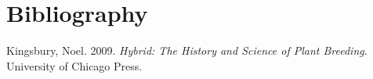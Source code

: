 \documentclass[ignorenonframetext,aspectratio=169]{beamer}
\begin{document}
\hypertarget{bibliography}{%
\section*{Bibliography}\label{bibliography}}

\hypertarget{refs}{}
\leavevmode\hypertarget{ref-kingsbury2009hybrid}{}%
Kingsbury, Noel. 2009. \emph{Hybrid: The History and Science of Plant
Breeding}. University of Chicago Press.
\end{document}
